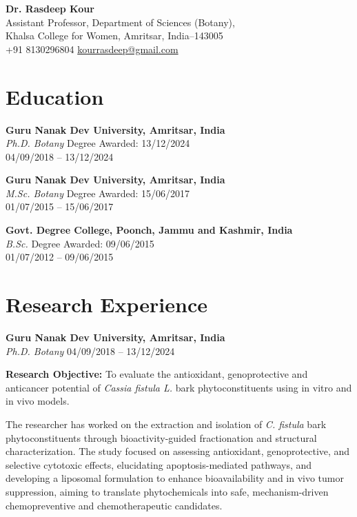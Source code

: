 \documentclass[11pt,a4paper]{article}
\begin{document}
\begin{center}
{\LARGE\bfseries Dr. Rasdeep Kour}\\[4pt]
Assistant Professor, Department of Sciences (Botany),\\
Khalsa College for Women, Amritsar, India--143005\\
+91 8130296804 \quad \href{mailto:kourrasdeep@gmail.com}{kourrasdeep@gmail.com}
\end{center}

\section*{Education}

\textbf{Guru Nanak Dev University, Amritsar, India}\\
\textit{Ph.D. Botany} \hfill Degree Awarded: 13/12/2024\\
04/09/2018 -- 13/12/2024

\textbf{Guru Nanak Dev University, Amritsar, India}\\
\textit{M.Sc. Botany} \hfill Degree Awarded: 15/06/2017\\
01/07/2015 -- 15/06/2017

\textbf{Govt. Degree College, Poonch, Jammu and Kashmir, India}\\
\textit{B.Sc.} \hfill Degree Awarded: 09/06/2015\\
01/07/2012 -- 09/06/2015

\vspace{0.5cm}

\section*{Research Experience}

\textbf{Guru Nanak Dev University, Amritsar, India}\\
\textit{Ph.D. Botany} \hfill 04/09/2018 -- 13/12/2024

\textbf{Research Objective:} To evaluate the antioxidant, genoprotective and anticancer potential of \textit{Cassia fistula L.} bark phytoconstituents using in vitro and in vivo models.

The researcher has worked on the extraction and isolation of \textit{C. fistula} bark phytoconstituents through bioactivity-guided fractionation and structural characterization. The study focused on assessing antioxidant, genoprotective, and selective cytotoxic effects, elucidating apoptosis-mediated pathways, and developing a liposomal formulation to enhance bioavailability and in vivo tumor suppression, aiming to translate phytochemicals into safe, mechanism-driven chemopreventive and chemotherapeutic candidates.
\end{document}
